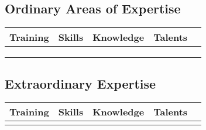 

\subsection{Ordinary Areas of Expertise}

\begin{center}
	\scriptsize
	\begin{xltabular}{\textwidth}{XXXXl}
		Training				&	Skills					& Knowledge					&  Talents 				& \\
		\hline
		\listUniversalTraining	&	\listUniversalSkills	&	\listUniversalKnowledge	& \listUniversalTalents &  \\
		\listModernTraining		&	\listModernSkills		&	\listModernKnowledge	& \listModernTalents	&  \\
		\listMedievalTraining	&	\listMedievalSkills		&	\listMedievalKnowledge	&   					&  \\
	\end{xltabular}
\end{center}

\subsection{Extraordinary Expertise}

\begin{center}
	\begin{xltabular}{\textwidth}{XXXXl}
		Training								&	Skills									& Knowledge								&  Talents & \\
		\hline
		\footnotesize \listFantasyTraining		&	\footnotesize	\listFantasySkills		&\footnotesize \listFantasyKnowledge	& \footnotesize  \listFantasyTalents 	&  \\
	\end{xltabular}
\end{center}


